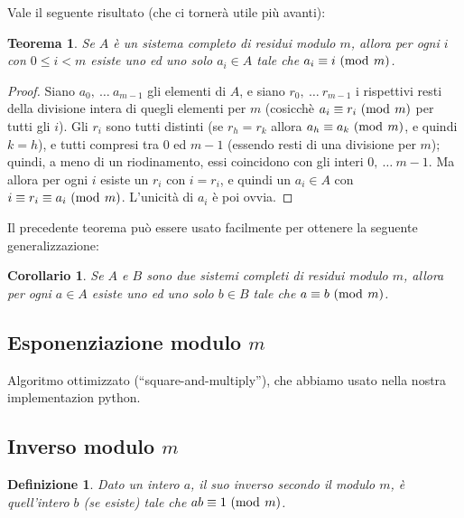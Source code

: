 \documentclass[pdflatex,11pt,a4paper,oneside]{article}
\newcommand{\congruent}[0]{\equiv}
\newcommand{\mmodop}[0]{\ensuremath{\operatorname{mod}}}
\newcommand{\mmod}[1]{\ensuremath{\allowbreak\ (\mmodop\:{#1})}}
\newtheorem{theorem}[TheoremLike]{Teorema}
\newtheorem{definition}[TheoremLike]{Definizione}
\newtheorem{corollary}[TheoremLike]{Corollario}
\begin{document}
\smallskip
Vale il seguente risultato (che ci torner\`a utile pi\`u avanti):
%
\begin{theorem}\label{thm:complete-residue-system}
Se $A$ \`e un sistema completo di residui modulo $m$, allora per ogni
$i$ con $0 \leq i < m$ esiste uno ed uno solo $a_i \in A$ tale che
$a_i \congruent i \mmod m$.
\end{theorem}
%
\begin{proof}
Siano $a_0,\: \ldots\: a_{m-1}$ gli elementi di $A$, e siano $r_0,\:
\ldots\: r_{m-1}$ i rispettivi resti della divisione intera di quegli
elementi per $m$ (cosicch\`e $a_i \congruent r_i \mmod m$ per tutti
gli $i$).  Gli $r_i$ sono tutti distinti (se $r_h = r_k$ allora
$a_h \congruent a_k \mmod m$, e quindi $k = h$), e tutti compresi tra
$0$ ed $m - 1$ (essendo resti di una divisione per $m$); quindi, a
meno di un riodinamento, essi coincidono con gli interi $0,\: \ldots\:
m -1$.  Ma allora per ogni $i$ esiste un $r_i$ con $i = r_i$, e quindi
un $a_i \in A$ con $i \congruent r_i \congruent a_i \mmod m$.
L'unicit\`a di $a_i$ \`e poi ovvia.
\end{proof}

Il precedente teorema pu\`o essere usato facilmente per ottenere la
seguente generalizzazione:
%
\begin{corollary}
Se $A$ e $B$ sono due sistemi completi di residui modulo $m$, allora per
ogni $a \in A$ esiste uno ed uno solo $b \in B$ tale che $a \congruent b
\mmod m$.
\end{corollary}


\subsection{Esponenziazione modulo $m$}

Algoritmo ottimizzato (``square-and-multiply''), che abbiamo usato nella
nostra implementazion python.


\subsection{Inverso modulo $m$}

\begin{definition}
Dato un intero $a$, il suo inverso secondo il modulo $m$, \`e quell'intero
$b$ (se esiste) tale che $ab \congruent 1 \mmod m$.
\end{definition}
\end{document}
